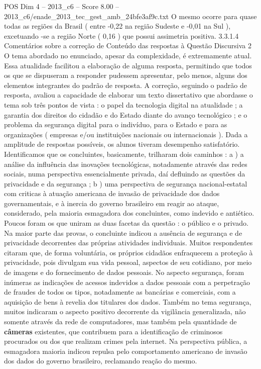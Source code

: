 \begin{textsample}{POS Dim 4 – 2013\_c6 – Score 8.00 – 2013\_c6/enade\_2013\_tec\_gest\_amb\_24bfe3af9c.txt}
O mesmo ocorre para quase todas as regiões da Brasil ( entre -0,22 na região Sudeste e -0,01 na Sul ), excetuando -se a região Norte ( 0,16 ) que possui assimetria positiva. 3.3.1.4 Comentários sobre a correção de Conteúdo das respostas à Questão Discursiva 2 O tema abordado no enunciado, apesar da complexidade, é extremamente atual.
Essa atualidade facilitou a elaboração de alguma resposta, permitindo que todos os que se dispuseram a responder pudessem apresentar, pelo menos, alguns dos elementos integrantes do padrão de resposta.
A correção, seguindo o padrão de resposta, avaliou a capacidade de elaborar um texto dissertativo que abordasse o tema sob três pontos de vista : o papel da tecnologia digital na atualidade ; a garantia dos direitos do cidadão e do Estado diante do avanço tecnológico ; e o problema da segurança digital para o indivíduo, para o Estado e para as organizações ( empresas e/ou instituições nacionais ou internacionais ).
Dada a amplitude de respostas possíveis, os alunos tiveram desempenho satisfatório.
Identificamos que os concluintes, basicamente, trilharam dois caminhos : a ) a análise da influência das inovações tecnológicas, notadamente através das redes sociais, numa perspectiva essencialmente privada, daí defluindo as questões da privacidade e da segurança ; b ) uma perspectiva de segurança nacional-estatal com criticas à atuação americana de invasão de privacidade dos dados governamentais, e à inercia do governo brasileiro em reagir ao ataque, considerado, pela maioria esmagadora dos concluintes, como indevido e antiético.
Poucos foram os que uniram as duas facetas da questão : o público e o privado.
Na maior parte das provas, o concluinte indicou a ausência de segurança e de privacidade decorrentes das próprias atividades individuais.
Muitos respondentes citaram que, de forma voluntária, os próprios cidadãos enfraquecem a proteção à privacidade, pois divulgam sua vida pessoal, aspectos de seu cotidiano, por meio de imagens e do fornecimento de dados pessoais.
No aspecto segurança, foram inúmeras as indicações de acessos indevidos a dados pessoais com a perpetração de fraudes de todos os tipos, notadamente as bancárias e comerciais, com a aquisição de bens à revelia dos titulares dos dados.
Também no tema segurança, muitos indicaram o aspecto positivo decorrente da vigilância generalizada, não somente através da rede de computadores, mas também pela quantidade de \textbf{câmeras} existentes, que contribuem para a identificação de criminosos procurados ou dos que realizam crimes pela internet.
Na perspectiva pública, a esmagadora maioria indicou repulsa pelo comportamento americano de invasão dos dados do governo brasileiro, reclamando reação do mesmo.

\end{textsample}
